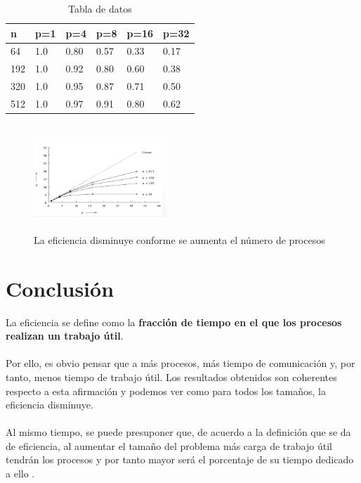 \documentclass[10pt,twocolumn,a4paper]{article}
\begin{document}
\begin{table}[H]
\begin{center}
\begin{tabular}{|l l l l l l|}
\hline
n&p=1&p=4&p=8&p=16&p=32\\
\hline
\hline
64		&1.0		&0.80	&0.57	&0.33	&0.17\\
192		&1.0		&0.92	&0.80	&0.60	&0.38\\ 
320		&1.0		&0.95	&0.87	&0.71	&0.50\\ 
512		&1.0		&0.97	&0.91	&0.80	&0.62\\ 
\hline
\end{tabular}
\caption{Tabla de datos}
\label{Tabla de datos}
\end{center}
\end{table}

\begin{figure}[H]
\begin{center}
\includegraphics[height=4cm, width=5cm]{grafico}
\caption{La eficiencia disminuye conforme se aumenta el número de procesos}
\end{center}
\end{figure}

\section{Conclusión}
La eficiencia se define como la \textbf{fracción de tiempo en el que los procesos realizan un trabajo útil}.\\ \\
Por ello, es obvio pensar que a más procesos, más tiempo de comunicación y, por tanto, menos tiempo de trabajo útil. Los resultados obtenidos son coherentes respecto a esta afirmación y podemos ver como para todos los tamaños, la eficiencia disminuye.\\ \\
Al mismo tiempo, se puede presuponer que, de acuerdo a la definición que se da de eficiencia, al aumentar el tamaño del problema más carga de trabajo útil tendrán los procesos y por tanto mayor  será el porcentaje de su tiempo dedicado a ello .


\end{document}
